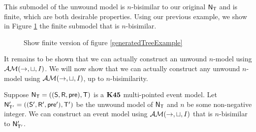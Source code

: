This submodel of the unwound model is $n$-bisimilar to our original $\mathrm{\mathsf{N}}_\mathrm{\mathsf{T}}$
and is finite, which are both desirable properties.
Using our previous example, we show in Figure \ref{genSubtreeExample} the
finite submodel that is $n$-bisimilar.

\begin{figure}[ht!]
\centering
\caption{\FIXME Show finite version of figure \ref{generatedTreeExample}} \label{genSubtreeExample}
\end{figure}

It remains to be shown that we can actually construct an unwound $n$-model using
$\mathcal{AM}(\to,\sqcup,I)$.
We will now show that we can actually construct any unwound $n$-model using $\mathcal{AM}(\to,
\sqcup, I)$, up to $n$-bisimilarity.

\begin{lemma} \label{lemma:unwoundModelBisimilarConstruct}
  Suppose $\mathrm{\mathsf{N}}_\mathrm{\mathsf{T}} = ((\mathrm{\mathsf{S}},\mathrm{\mathsf{R}},\mathrm{\mathsf{pre}}),\mathrm{\mathsf{T}})$ is a $\bf K45$ multi-pointed
  event model.
	Let $\mathrm{\mathsf{N}}'_{\mathrm{\mathsf{T}}'} = ((\mathrm{\mathsf{S}}',\mathrm{\mathsf{R}}',\mathrm{\mathsf{pre}}'),\mathrm{\mathsf{T}}')$ be the unwound model of
  $\mathrm{\mathsf{N}}_\mathrm{\mathsf{T}}$ and $n$ be some non-negative integer.
  We can construct an event model using $\mathcal{AM}(\to,\sqcup,I)$ that is $n$-bisimilar to
  $\mathrm{\mathsf{N}}'_{\mathrm{\mathsf{T}}'}$.
\end{lemma}
